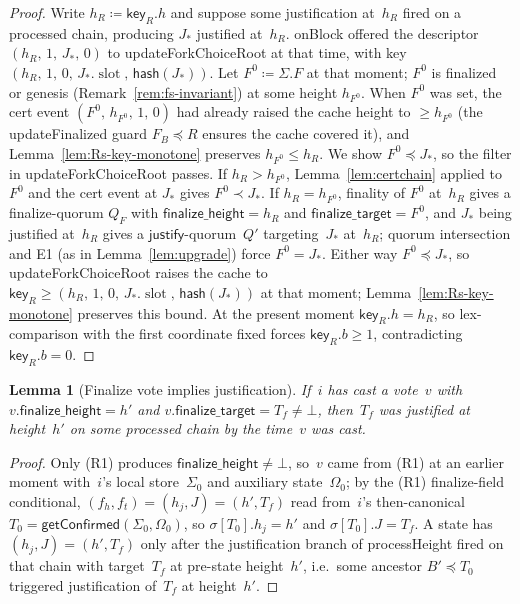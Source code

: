 \documentclass{article}
\newcommand{\slot}[0]{\ensuremath{\operatorname{\mathrm{slot}}}}
\newcommand{\just}{\ensuremath{\mathsf{justify}}\xspace}
\newcommand{\finalizeHeight}{\mathsf{finalize\_height}}
\newcommand{\finalizeTarget}{\mathsf{finalize\_target}}
\newcommand{\hash}{\mathsf{hash}}
\newcommand{\key}{\mathsf{key}}
\newcommand{\processHeight}{\textsf{processHeight}\xspace}
\newcommand{\onBlock}{\textsf{onBlock}\xspace}
\newcommand{\updateForkChoiceRoot}{\textsf{updateForkChoiceRoot}\xspace}
\newcommand{\updateFinalized}{\textsf{updateFinalized}\xspace}
\newcommand{\getConfirmed}{\textsf{getConfirmed}\xspace}
\theoremstyle{plain}
\newtheorem{lemma}{Lemma}
\theoremstyle{definition}
\theoremstyle{remark}
\begin{document}
\begin{proof}
Write $h_R \coloneqq \key_R.h$ and suppose some justification at~$h_R$ fired on a processed chain, producing $J_\ast$ justified at~$h_R$.
\onBlock offered the descriptor $(h_R,\, 1,\, J_\ast,\, 0)$ to \updateForkChoiceRoot at that time, with key $(h_R,\, 1,\, 0,\, J_\ast.\slot,\, \hash(J_\ast))$.
Let $F^0 \coloneqq \Sigma.F$ at that moment; $F^0$ is finalized or genesis (Remark~\ref{rem:fs-invariant}) at some height $h_{F^0}$.
When $F^0$ was set, the cert event $(F^0,\, h_{F^0},\, 1,\, 0)$ had already raised the cache height to $\geq h_{F^0}$ (the \updateFinalized guard $F_B \preceq R$ ensures the cache covered it), and Lemma~\ref{lem:Rs-key-monotone} preserves $h_{F^0} \leq h_R$.
We show $F^0 \preceq J_\ast$, so the filter in \updateForkChoiceRoot passes.
If $h_R > h_{F^0}$, Lemma~\ref{lem:certchain} applied to $F^0$ and the cert event at $J_\ast$ gives $F^0 \prec J_\ast$.
If $h_R = h_{F^0}$, finality of $F^0$ at~$h_R$ gives a finalize-quorum $Q_F$ with $\finalizeHeight = h_R$ and $\finalizeTarget = F^0$, and $J_\ast$ being justified at~$h_R$ gives a \just-quorum~$Q'$ targeting~$J_\ast$ at~$h_R$; quorum intersection and E1 (as in Lemma~\ref{lem:upgrade}) force $F^0 = J_\ast$.
Either way $F^0 \preceq J_\ast$, so \updateForkChoiceRoot raises the cache to $\key_R \geq (h_R,\, 1,\, 0,\, J_\ast.\slot,\, \hash(J_\ast))$ at that moment; Lemma~\ref{lem:Rs-key-monotone} preserves this bound.
At the present moment $\key_R.h = h_R$, so lex-comparison with the first coordinate fixed forces $\key_R.b \geq 1$, contradicting $\key_R.b = 0$.
\end{proof}

\begin{lemma}[Finalize vote implies justification]\label{lem:no-finalize-without-just}
If~$i$ has cast a vote~$v$ with $v.\finalizeHeight = h'$ and $v.\finalizeTarget = T_f \neq \bot$, then~$T_f$ was justified at height~$h'$ on some processed chain by the time~$v$ was cast.
\end{lemma}

\begin{proof}
Only (R1) produces $\finalizeHeight \neq \bot$, so~$v$ came from (R1) at an earlier moment with~$i$'s local store~$\Sigma_0$ and auxiliary state~$\Omega_0$; by the (R1) finalize-field conditional, $(f_h, f_t) = (h_j, J) = (h', T_f)$ read from~$i$'s then-canonical $T_0 = \getConfirmed(\Sigma_0, \Omega_0)$, so $\sigma[T_0].h_j = h'$ and $\sigma[T_0].J = T_f$.
A state has $(h_j, J) = (h', T_f)$ only after the justification branch of \processHeight fired on that chain with target~$T_f$ at pre-state height~$h'$, i.e.\ some ancestor $B' \preceq T_0$ triggered justification of~$T_f$ at height~$h'$.
\end{proof}
\end{document}
